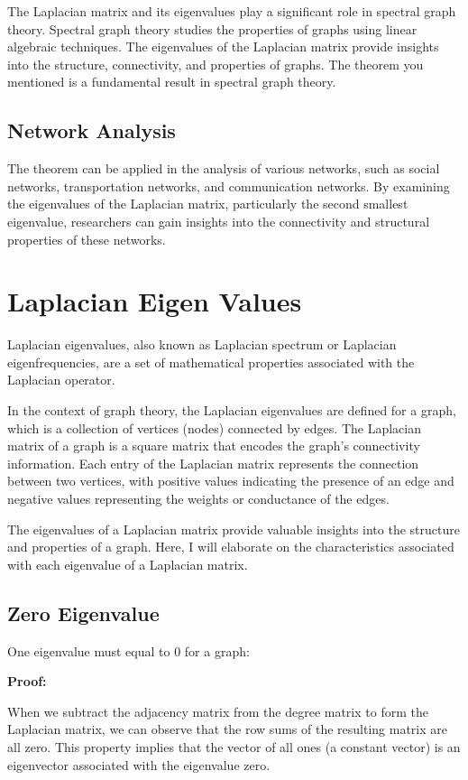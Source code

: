 \documentclass{article}
\begin{document}
The Laplacian matrix and its eigenvalues play a significant role in spectral graph theory. Spectral graph theory studies the properties of graphs using linear algebraic techniques. The eigenvalues of the Laplacian matrix provide insights into the structure, connectivity, and properties of graphs. The theorem you mentioned is a fundamental result in spectral graph theory.

\subsection*{Network Analysis}

The theorem can be applied in the analysis of various networks, such as social networks, transportation networks, and communication networks. By examining the eigenvalues of the Laplacian matrix, particularly the second smallest eigenvalue, researchers can gain insights into the connectivity and structural properties of these networks.


\section*{Laplacian Eigen Values}
Laplacian eigenvalues, also known as Laplacian spectrum or Laplacian eigenfrequencies, are a set of mathematical properties associated with the Laplacian operator.

In the context of graph theory, the Laplacian eigenvalues are defined for a graph, which is a collection of vertices (nodes) connected by edges. The Laplacian matrix of a graph is a square matrix that encodes the graph's connectivity information. Each entry of the Laplacian matrix represents the connection between two vertices, with positive values indicating the presence of an edge and negative values representing the weights or conductance of the edges.

The eigenvalues of a Laplacian matrix provide valuable insights into the structure and properties of a graph. Here, I will elaborate on the characteristics associated with each eigenvalue of a Laplacian matrix.

\subsection*{Zero Eigenvalue}

One eigenvalue must equal to 0 for a graph:

\textbf{Proof:}

When we subtract the adjacency matrix from the degree matrix to form the Laplacian matrix, we can observe that the row sums of the resulting matrix are all zero. This property implies that the vector of all ones (a constant vector) is an eigenvector associated with the eigenvalue zero.
\end{document}
